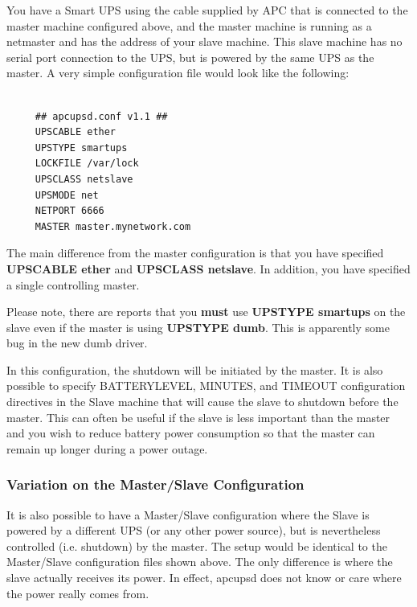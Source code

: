 \label{index-Slave-Configuration-77}
\label{index-Configuration_002c-Slave-78}
\label{index-Example_002c-Slave-conf-79}
You have a Smart UPS using the cable supplied by APC that is connected to the
master machine configured above, and the master machine is running as a
netmaster and has the address of your slave machine.  This slave machine has
no serial port connection to the UPS, but is powered by the same UPS as the
master.  A very simple configuration file would look like the following: 

\footnotesize
\begin{verbatim}
     
     ## apcupsd.conf v1.1 ##
     UPSCABLE ether
     UPSTYPE smartups
     LOCKFILE /var/lock
     UPSCLASS netslave
     UPSMODE net
     NETPORT 6666
     MASTER master.mynetwork.com
\end{verbatim}
\normalsize

The main difference from the master configuration is that you have specified
{\bf UPSCABLE ether} and {\bf UPSCLASS netslave}.  In addition, you have
specified a single controlling master.  

Please note, there are reports that you {\bf must} use {\bf UPSTYPE smartups}
on the slave even if the master is using {\bf UPSTYPE dumb}. This is
apparently some bug in the new dumb driver.  

In this configuration, the shutdown will be initiated by the master. It is
also possible to specify BATTERYLEVEL, MINUTES, and TIMEOUT configuration
directives in the Slave machine that will cause the slave to shutdown before
the master. This can often be useful if the slave is less important than the
master and you wish to reduce battery power consumption so that the master can
remain up longer during a power outage. 

\label{Variation-on-the-Master_002fSlave-Configuration}

\subsubsection*{Variation on the Master/Slave Configuration}

\label{index-Master_002fSlave-variation-80}
It is also possible to have a Master/Slave configuration where the Slave is
powered by a different UPS (or any other power source), but is nevertheless
controlled (i.e.  shutdown) by the master.  The setup would be identical to
the Master/Slave configuration files shown above.  The only difference is
where the slave actually receives its power.  In effect, apcupsd does not know
or care where the power really comes from. 

